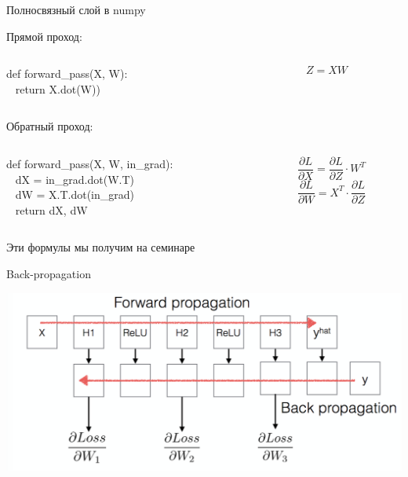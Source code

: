 \documentclass[notes,12pt, aspectratio=169]{beamer}
\begin{document}
\begin{frame}[fragile]{Полносвязный слой в numpy}

\alert{Прямой проход:} 
	
\begin{columns}
\begin{column}{.49\textwidth}
{\color{green} def}  {\color{blue} forward\_pass}(X, W):  \\
\mbox{ } \hspace{5mm} {\color{green} return } X.dot(W))
\end{column}
\begin{column}{.49\textwidth}
\[ Z = XW \]
\end{column}
\end{columns}

\vfill 

\alert{Обратный проход:}

\begin{columns}
\begin{column}{.49\textwidth}
{\color{green} def}  {\color{blue} forward\_pass}(X, W, in\_grad):  \\
\mbox{ } \hspace{5mm} dX = in\_grad.dot(W.T) \\
\mbox{ } \hspace{5mm} dW = X.T.dot(in\_grad) \\
\mbox{ } \hspace{5mm} {\color{green} return } dX, dW
\end{column}
\begin{column}{.49\textwidth}

\[  \frac{\partial L}{\partial X}  =   \frac{\partial L}{\partial Z} \cdot W^T \]
\[ \frac{\partial L}{\partial W}  =  X^T \cdot \frac{\partial L}{\partial Z} \]
\end{column}
\end{columns}
\begin{center}
	\alert{Эти формулы мы получим на семинаре}
\end{center}
\end{frame}


\begin{frame}{Back-propagation}
\begin{center}
	\includegraphics[width=.8\linewidth]{backpropagation.png}
\end{center}
\end{frame}
\end{document}
